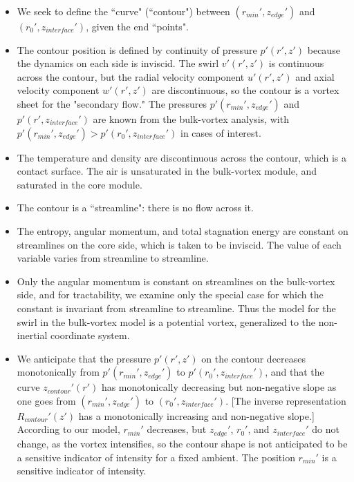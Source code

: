 \documentclass[preprint, prX]{revtex4}
\newcommand{\rmin}{r_{min}}
\newcommand{\zedge}{z_{edge}}
\newcommand{\zinter}{z_{interface}}
\begin{document}
\begin{itemize}

\item We seek to define the ``curve" (``contour") between $(\rmin', \zedge')$ and $(r_0', \zinter')$, given the end ``points".

\item The contour position is defined by continuity of pressure $p'(r',z')$ because the dynamics on each side is inviscid. The swirl $v'(r',z')$ is continuous across the contour, but the radial velocity component $u'(r',z')$ and axial velocity component $w'(r',z')$ are discontinuous, so the contour is a vortex sheet for the "secondary flow." The pressures $p'(\rmin',\zedge')$ and $p'(r',\zinter')$ are known from the bulk-vortex analysis, with $p'(\rmin',\zedge') > p'(r_0',\zinter')$ in cases of interest.

\item The temperature and density are discontinuous across the contour, which is a contact surface. The air is unsaturated in the bulk-vortex module, and saturated in the core module.

\item The contour is a ``streamline": there is no flow across it.

\item The entropy, angular momentum, and total stagnation energy are constant on streamlines on the core side, which is taken to be inviscid. The value of each variable varies from streamline to streamline.

\item Only the angular momentum is constant on streamlines on the bulk-vortex side, and for tractability, we examine only the special case for which the constant is invariant from streamline to streamline. Thus the model for the swirl in the bulk-vortex model is a potential vortex, generalized to the non-inertial coordinate system.

\item We anticipate that the pressure $p'(r',z')$ on the contour decreases monotonically from $p'(\rmin',\zedge')$ to $p'(r_0',\zinter')$, and that the curve $z_{contour}'(r')$ has monotonically decreasing but non-negative slope as one goes from $(\rmin', \zedge')$ to $(r_0', \zinter')$. [The inverse representation $R_{contour}'(z')$ has a monotonically increasing and non-negative slope.] According to our model, $\rmin'$ decreases, but $\zedge'$, $r_0'$, and $\zinter'$ do not change, as the vortex intensifies, so the contour shape is not anticipated to be a sensitive indicator of intensity for a fixed ambient. The position $\rmin'$ is a sensitive indicator of intensity.
\end{itemize}
\end{document}
